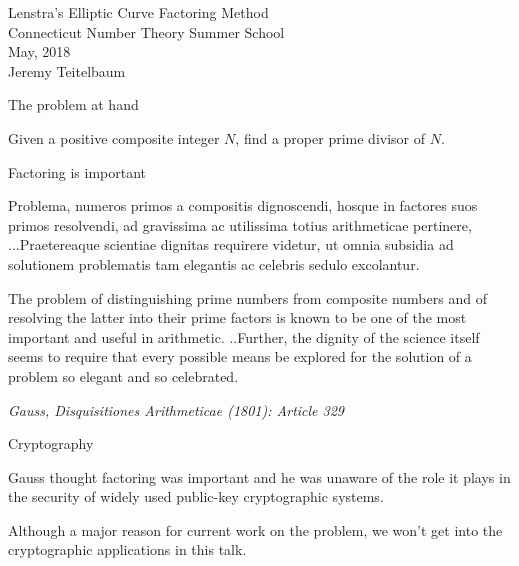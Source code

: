 \documentclass{beamer}
\begin{document}
\begin{frame}
	\begin{center}
		Lenstra's Elliptic Curve Factoring Method \\
		Connecticut Number Theory Summer School \\
		May, 2018 \\
		\bigskip
		Jeremy Teitelbaum
	\end{center}
\end{frame}
\begin{frame}{The problem at hand}
	\begin{problem} Given a positive composite integer $N$, find a proper prime divisor of $N$.
	\end{problem}
\end{frame}
\begin{frame}{Factoring is important}

	{\small
	Problema, numeros primos a compositis dignoscendi, 
	hosque in factores suos primos resolvendi, ad gravissima ac utilissima totius arithmeticae pertinere, 
	...Praetereaque scientiae dignitas requirere videtur, ut omnia subsidia ad solutionem 
	problematis tam elegantis ac celebris sedulo excolantur.
	
	\medskip\noindent
	The problem of distinguishing prime numbers from composite numbers and of
	resolving the latter into their prime factors is known to be one of the most
	important and useful in arithmetic. ..Further, the dignity of the
	science itself seems to require that every possible means be explored for
	the solution of a problem so elegant and so celebrated. 
	
	\medskip\noindent
	{\it Gauss,  Disquisitiones Arithmeticae (1801): Article 329}
	}		
			
\end{frame}
\begin{frame}{Cryptography}
	\begin{block}{}
	Gauss thought factoring was important and he was unaware of the role it
	plays in the security of widely used public-key cryptographic systems.
	\end{block}
	\begin{block}{}
		Although a major reason for current work on the problem, we won't get into the cryptographic applications in this talk.
	\end{block}
\end{frame}
	
\end{document}
